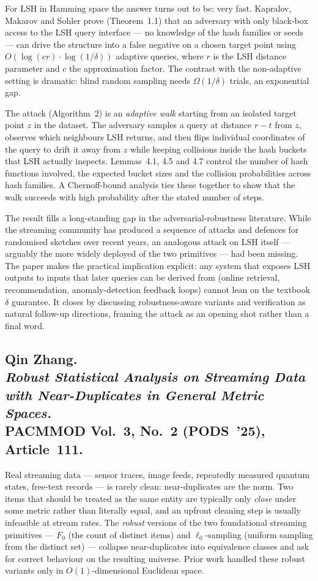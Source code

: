 \documentclass[11pt,a4paper]{article}
\begin{document}
For LSH in Hamming space the answer turns out to be: very fast.
Kapralov, Makarov and Sohler prove (Theorem~1.1) that an adversary with
only black-box access to the LSH query interface --- no knowledge of the
hash families or seeds --- can drive the structure into a false negative
on a chosen target point using $O(\log(cr)\cdot\log(1/\delta))$ adaptive
queries, where $r$ is the LSH distance parameter and $c$ the approximation
factor. The contrast with the non-adaptive setting is dramatic: blind
random sampling needs $\Omega(1/\delta)$ trials, an exponential gap.

The attack (Algorithm~2) is an \emph{adaptive walk} starting from an
isolated target point $z$ in the dataset. The adversary samples a query at
distance $r-t$ from $z$, observes which neighbours LSH returns, and then
flips individual coordinates of the query to drift it away from $z$ while
keeping collisions inside the hash buckets that LSH actually inspects.
Lemmas~4.1, 4.5 and 4.7 control the number of hash functions involved, the
expected bucket sizes and the collision probabilities across hash
families. A Chernoff-bound analysis ties these together to show that the
walk succeeds with high probability after the stated number of steps.

The result fills a long-standing gap in the adversarial-robustness
literature. While the streaming community has produced a sequence of
attacks and defences for randomised sketches over recent years, an
analogous attack on LSH itself --- arguably the more widely deployed of the
two primitives --- had been missing. The paper makes the practical
implication explicit: any system that exposes LSH outputs to inputs that
later queries can be derived from (online retrieval, recommendation,
anomaly-detection feedback loops) cannot lean on the textbook $\delta$
guarantee. It closes by discussing robustness-aware variants and
verification as natural follow-up directions, framing the attack as an
opening shot rather than a final word.

\subsection*{Qin Zhang.\\
\emph{Robust Statistical Analysis on Streaming Data with Near-Duplicates
in General Metric Spaces.}\\
PACMMOD Vol.~3, No.~2 (PODS~'25), Article~111.}

Real streaming data --- sensor traces, image feeds, repeatedly measured
quantum states, free-text records --- is rarely clean: near-duplicates are
the norm. Two items that should be treated as the same entity are typically
only \emph{close} under some metric rather than literally equal, and an
upfront cleaning step is usually infeasible at stream rates. The
\emph{robust} versions of the two foundational streaming primitives ---
$F_0$ (the count of distinct items) and $\ell_0$-sampling (uniform sampling
from the distinct set) --- collapse near-duplicates into equivalence
classes and ask for correct behaviour on the resulting universe. Prior work
handled these robust variants only in $O(1)$-dimensional Euclidean space.
\end{document}
